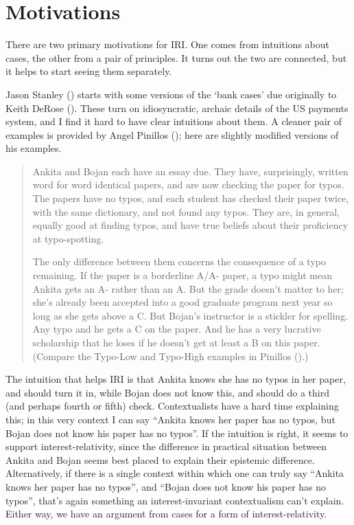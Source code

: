 \documentclass[
  11pt,
  letterpaper,
  DIV=11,
  numbers=noendperiod,
  twoside]{scrartcl}
\begin{document}
\section{Motivations}\label{motivations}

There are two primary motivations for IRI. One comes from intuitions
about cases, the other from a pair of principles. It turns out the two
are connected, but it helps to start seeing them separately.

Jason Stanley () starts with some
versions of the `bank cases' due originally to Keith DeRose
(). These turn on idiosyncratic, archaic
details of the US payments system, and I find it hard to have clear
intuitions about them. A cleaner pair of examples is provided by Angel
Pinillos (); here are slightly modified
versions of his examples.

\begin{quote}
Ankita and Bojan each have an essay due. They have, surprisingly,
written word for word identical papers, and are now checking the paper
for typos. The papers have no typos, and each student has checked their
paper twice, with the same dictionary, and not found any typos. They
are, in general, equally good at finding typos, and have true beliefs
about their proficiency at typo-spotting.

The only difference between them concerns the consequence of a typo
remaining. If the paper is a borderline A/A- paper, a typo might mean
Ankita gets an A- rather than an A. But the grade doesn't matter to her;
she's already been accepted into a good graduate program next year so
long as she gets above a C. But Bojan's instructor is a stickler for
spelling. Any typo and he gets a C on the paper. And he has a very
lucrative scholarship that he loses if he doesn't get at least a B on
this paper. (Compare the Typo-Low and Typo-High examples in Pinillos
().)
\end{quote}

The intuition that helps IRI is that Ankita knows she has no typos in
her paper, and should turn it in, while Bojan does not know this, and
should do a third (and perhaps fourth or fifth) check. Contextualists
have a hard time explaining this; in this very context I can say
``Ankita knows her paper has no typos, but Bojan does not know his paper
has no typos''. If the intuition is right, it seems to support
interest-relativity, since the difference in practical situation between
Ankita and Bojan seems best placed to explain their epistemic
difference. Alternatively, if there is a single context within which one
can truly say ``Ankita knows her paper has no typos'', and ``Bojan does
not know his paper has no typos'', that's again something an
interest-invariant contextualism can't explain. Either way, we have an
argument from cases for a form of interest-relativity.
\end{document}
